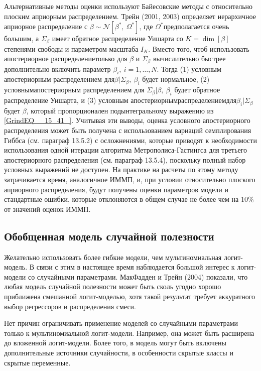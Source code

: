 Альтернативные методы оценки используют Байесовские методы с относительно плоским априорным распределением. Трейн (2001, 2003) определяет иерархичное априорное распределение с $\beta \sim {\mathcal N}[{\beta }^*,\ {\Omega }^*]$, где ${\Omega }^*$предполагается очень большим, а ${\Sigma }_{\beta }$ имеет обратное распределение Уишарта со $K={\dim  \left[\beta \right]\ }$ степенями свободы и параметром масштаба $I_K$. Вместо того, чтоб использовать апостериорное распределениетолько для $\beta $ и ${\Sigma }_{\beta }$ вычислительно быстрее дополнительно включить параметр ${\beta }_i,\ i=1,\dots ,N.$ Тогда (1) условным апостериорным распределением для$\beta |{\Sigma }_{\beta },\ {\beta }_i$ будет нормальное, (2) условнымапостериорным распределением для ${\Sigma }_{\beta }|\beta ,\ {\beta }_i$ будет обратное распределение Уишарта, и (3) условным апостериорнымраспределениемдля${\beta }_i|{\Sigma }_{\beta }$будет $\beta $, который пропорционален подынтегральному выражению из \eqref{GrindEQ__15_41_}. Учитывая эти выводы, оценка условного апостериорного распределения может быть получена с использованием вариаций семплирования Гиббса (см. параграф 13.5.2) с осложнениями, которые приводят к необходимости использования одной итерации алгоритма Метрополиса-Гастингса для третьего апостериорного распределения (см. параграф 13.5.4), поскольку полный набор условных выражений не доступен. На практике на расчеты по этому методу затрачивается время, аналогичное ИММП, и, при условии относительно плоского априорного распределения, будут получены оценки параметров модели и стандартные ошибки, которые отклоняются в общем случае не более чем на 10\% от значений оценок ИММП.

\subsection{Обобщенная модель случайной полезности}

Желательно использовать более гибкие модели, чем мультиномиальная логит-модель. В связи с этим в настоящее время наблюдается большой интерес к логит-модели со случайными параметрами. МакФадден и Трейн (2004) показали, что любая модель случайной полезности может быть сколь угодно хорошо приближена смешанной логит-моделью, хотя такой результат требует аккуратного выбор регрессоров и  распределения смеси.

Нет причин ограничивать применение моделей со случайными параметрами только к мультиномиальной логит-модели. Например, она может быть расширена до вложенной логит-модели. Более того, в модель могут быть включены дополнительные источники случайности, в особенности скрытые классы и скрытые переменные.

